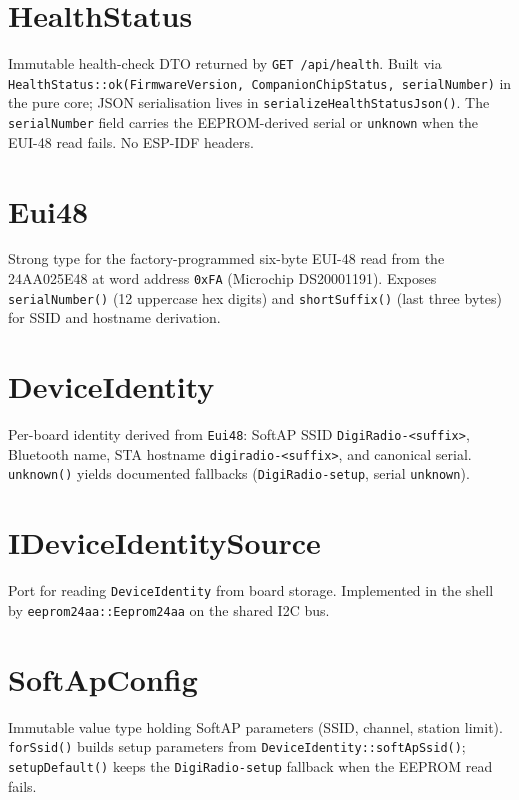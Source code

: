 \section{HealthStatus}\label{cls:HealthStatus}
Immutable health-check DTO returned by \texttt{GET /api/health}. Built via
\texttt{HealthStatus::ok(FirmwareVersion, CompanionChipStatus, serialNumber)}
in the pure core; JSON serialisation lives in \texttt{serializeHealthStatusJson()}.
The \texttt{serialNumber} field carries the EEPROM-derived serial or
\texttt{unknown} when the EUI-48 read fails. No ESP-IDF headers.

\section{Eui48}\label{cls:Eui48}
Strong type for the factory-programmed six-byte EUI-48 read from the
24AA025E48 at word address \texttt{0xFA} (Microchip DS20001191). Exposes
\texttt{serialNumber()} (12 uppercase hex digits) and \texttt{shortSuffix()}
(last three bytes) for SSID and hostname derivation.

\section{DeviceIdentity}\label{cls:DeviceIdentity}
Per-board identity derived from \texttt{Eui48}: SoftAP SSID
\texttt{DigiRadio-<suffix>}, Bluetooth name, STA hostname
\texttt{digiradio-<suffix>}, and canonical serial. \texttt{unknown()} yields
documented fallbacks (\texttt{DigiRadio-setup}, serial \texttt{unknown}).

\section{IDeviceIdentitySource}\label{cls:IDeviceIdentitySource}
Port for reading \texttt{DeviceIdentity} from board storage. Implemented in
the shell by \texttt{eeprom24aa::Eeprom24aa} on the shared I2C bus.


\section{SoftApConfig}\label{cls:SoftApConfig}
Immutable value type holding SoftAP parameters (SSID, channel, station
limit). \texttt{forSsid()} builds setup parameters from
\texttt{DeviceIdentity::softApSsid()}; \texttt{setupDefault()} keeps the
\texttt{DigiRadio-setup} fallback when the EEPROM read fails.

